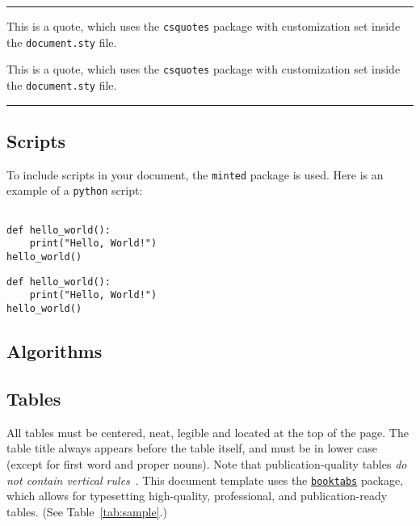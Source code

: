 \noindent\rule{\linewidth}{0.5pt}

\begin{multicols}{2}
  \begin{displayquote}
    This is a quote, which uses the \verb|csquotes| package with customization set inside the \verb|document.sty| file.
  \end{displayquote}
  \columnbreak{}
  \begin{latexcode}
\begin{displayquote}
  This is a quote, which uses the \verb|csquotes| package with customization set inside the \verb|document.sty| file.
\end{displayquote}
  \end{latexcode}
\end{multicols}

\noindent\rule{\linewidth}{0.5pt}

\subsection{Scripts}

To include scripts in your document, the \verb|minted| package is used.
Here is an example of a \verb|python| script:

\begin{multicols}{2}
  \begin{verbatim}

def hello_world():
    print("Hello, World!")
hello_world()
  \end{verbatim}
  \columnbreak{}
  \begin{latexcode}
\begin{verbatim}
def hello_world():
    print("Hello, World!")
hello_world()
\end{verbatim}
  \end{latexcode}
\end{multicols}

\subsection{Algorithms}


\subsection{Tables}

All tables must be centered, neat, legible and located at the top of the page.
The table title always appears before the table itself, and must be in lower case (except for first word and proper nouns).
Note that publication-quality tables \emph{do not contain vertical rules}~\autocite{neurips2023template}. 
This document template uses the \href{https://www.ctan.org/pkg/booktabs}{\Verb|booktabs|} package, which allows for typesetting high-quality, professional, and publication-ready tables. 
(See Table~\ref{tab:sample}.)

